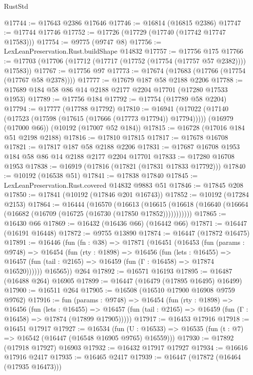 \begin{lexlean}{RustStd}
\begin{coremodule}
@17744 := @17643 @2386 @17646
@17746 := @16814 (@16815 @2386)
@17747 := @17744 @17746
@17752 := @17726 (@17729 (@17740 (@17742 @17747 @17583)))
@17754 := @9775 (@9747 @8)
@17756 := LexLeanPreservation.Rust.buildShape @14832
@17757 := @17756 @175
@17766 := @17703 (@17706 (@17712 (@17717 (@17752 (@17754 (@17757 @57 @2382)))) @17583))
@17767 := @17756 @97
@17773 := @17674 (@17683 (@17766 (@17754 (@17767 @58 @2378))))
@17777 := @17679 @187 @58 @2188 @2206
@17788 := @17689 @184 @58 @86 @14 @2188 @2177 @2204 @17701 (@17280 @17533 @1953)
@17789 := @17756 @184
@17792 := @17754 (@17789 @58 @2204)
@17794 := @17777 (@17788 @17792)
@17810 := @16941
    (@17022 (@17140 (@17523 (@17598 (@17615 (@17666 (@17773 @17794)) @17794)))))
    (@16979 (@17000 @66))
    (@10192 (@17007 @52 @184))
@17815 := @16728 (@17016 @184 @51 @2198 @2188)
@17816 := @17810 @17815
@17817 := @17678 @16708
@17821 := @17817 @187 @58 @2188 @2206
@17831 := @17687 @16708 @1953 @184 @58 @86 @14 @2188 @2177 @2204 @17701
@17833 := @17280 @16708 @1953
@17838 := @16919 (@17816 (@17821 (@17831 @17833 @17792)))
@17840 := @10192 (@16538 @51)
@17841 := @17838 @17840
@17845 := LexLeanPreservation.Rust.covered @14832 @9883 @51
@17846 := @17845 @208
@17850 := @17841 (@10192 (@17846 @201 @16743))
@17852 := @10192 (@17284 @2153)
@17864 := @16444
    (@16570
      (@16613
        (@16615 (@16618 (@16640 (@16664 (@16682 (@16709 (@16725 (@16730 (@17850 @17852)))))))))))
@17865 := @16430 @66
@17869 := @16432 (@16436 @66) (@16442 @66)
@17871 := @16447 (@16191 @16448)
@17872 := @9755 @13890
@17874 := @16447 (@17872 @16475)
@17891 := @16446
    (fun (fn : @38) =>
    @17871
      (@16451
        (@16453
          (fun (params : @9748) =>
          @16454
            (fun (rty : @1898) =>
            @16456
              (fun (lets : @16455) =>
              @16457 (fun (tail : @2165) => @16459 (fun (Γ : @16458) => @17874 @16520))))))
        @16565))
    @264
@17892 := @16571 @16193
@17895 := @16487 (@16488 @264) @16905
@17899 := @16447 (@16479 (@17895 @16495) @16499)
@17900 := @16511 @264
@17905 := @16508 (@16510 @17900 @16908 @9759 @9762)
@17916 := fun (params : @9748) =>
  @16454
    (fun (rty : @1898) =>
    @16456
      (fun (lets : @16455) =>
      @16457 (fun (tail : @2165) => @16459 (fun (Γ : @16458) => @17874 (@17899 @17905)))))
@17917 := @16453 @17916
@17918 := @16451 @17917
@17927 := @16534
    (fun (U : @16533) => @16535 (fun (t : @7) => @16542 (@16447 (@16548 @16905 @9765) @16559)))
@17930 := @17892 (@17918 @17927) @16903
@17932 := @16432 @17917 @17927
@17934 := @16616 @17916 @2417
@17935 := @16465 @2417
@17939 := @16447 (@17872 (@16464 (@17935 @16473)))

\end{coremodule}
\end{lexlean}
